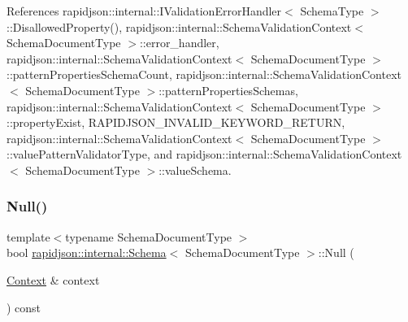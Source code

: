 \begin{DoxyCode}{0}

\end{DoxyCode}


References rapidjson\+::internal\+::\+I\+Validation\+Error\+Handler$<$ Schema\+Type $>$\+::\+Disallowed\+Property(), rapidjson\+::internal\+::\+Schema\+Validation\+Context$<$ Schema\+Document\+Type $>$\+::error\+\_\+handler, rapidjson\+::internal\+::\+Schema\+Validation\+Context$<$ Schema\+Document\+Type $>$\+::pattern\+Properties\+Schema\+Count, rapidjson\+::internal\+::\+Schema\+Validation\+Context$<$ Schema\+Document\+Type $>$\+::pattern\+Properties\+Schemas, rapidjson\+::internal\+::\+Schema\+Validation\+Context$<$ Schema\+Document\+Type $>$\+::property\+Exist, R\+A\+P\+I\+D\+J\+S\+O\+N\+\_\+\+I\+N\+V\+A\+L\+I\+D\+\_\+\+K\+E\+Y\+W\+O\+R\+D\+\_\+\+R\+E\+T\+U\+RN, rapidjson\+::internal\+::\+Schema\+Validation\+Context$<$ Schema\+Document\+Type $>$\+::value\+Pattern\+Validator\+Type, and rapidjson\+::internal\+::\+Schema\+Validation\+Context$<$ Schema\+Document\+Type $>$\+::value\+Schema.

\mbox{\label{classrapidjson_1_1internal_1_1_schema_a31efa42f0cf98eaa6336f8bedbddd026}} 
\subsubsection{\texorpdfstring{Null()}{Null()}}
{\footnotesize\ttfamily template$<$typename Schema\+Document\+Type $>$ \\
bool \mbox{\hyperlink{classrapidjson_1_1internal_1_1_schema}{rapidjson\+::internal\+::\+Schema}}$<$ Schema\+Document\+Type $>$\+::Null (\begin{DoxyParamCaption}\item[{\mbox{\hyperlink{classrapidjson_1_1internal_1_1_schema_afca06b1f51d1bc18403bdf3f4d55ffef}{Context}} \&}]{context }\end{DoxyParamCaption}) const}



